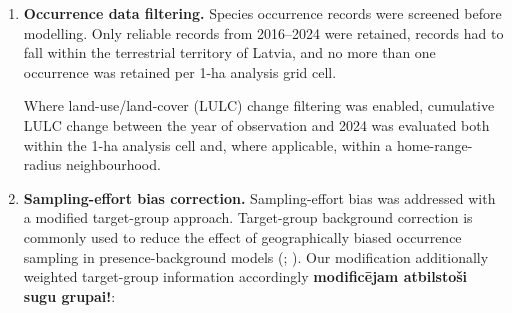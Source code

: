 \documentclass[
  openany]{book}
\begin{document}
\begin{enumerate}
\def\labelenumi{\arabic{enumi}.}
\item
  \textbf{Occurrence data filtering.} Species occurrence records were screened before modelling. Only reliable records from 2016--2024 were retained, records had to fall within the terrestrial territory of Latvia, and no more than one occurrence was retained per 1-ha analysis grid cell.

  Where land-use/land-cover (LULC) change filtering was enabled, cumulative LULC change between the year of observation and 2024 was evaluated both within the 1-ha analysis cell and, where applicable, within a home-range-radius neighbourhood.
\item
  \textbf{Sampling-effort bias correction.} Sampling-effort bias was addressed with a modified target-group approach. Target-group background correction is commonly used to reduce the effect of geographically biased occurrence sampling in presence-background models (; ). Our modification additionally weighted target-group information accordingly \textbf{modificējam atbilstoši sugu grupai!}:


\end{enumerate}
\end{document}
